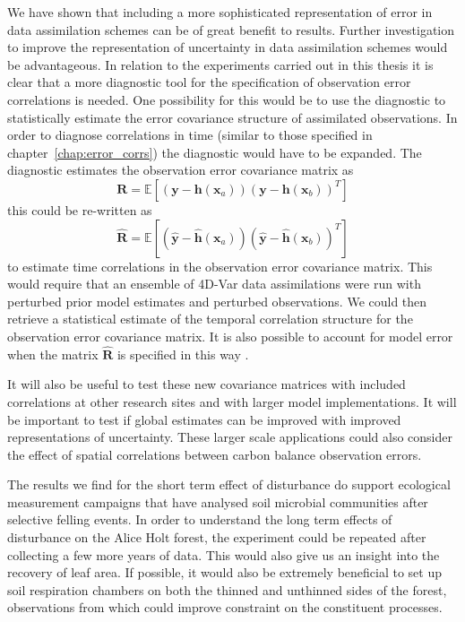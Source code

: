 We have shown that including a more sophisticated representation of error in data assimilation schemes can be of great benefit to results. Further investigation to improve the representation of uncertainty in data assimilation schemes would be advantageous. In relation to the experiments carried out in this thesis it is clear that a more diagnostic tool for the specification of observation error correlations is needed. One possibility for this would be to use the \citet{desroziers2005diagnosis} diagnostic to statistically estimate the error covariance structure of assimilated observations. In order to diagnose correlations in time (similar to those specified in chapter~\ref{chap:error_corrs}) the \citet{desroziers2005diagnosis} diagnostic would have to be expanded. The \citet{desroziers2005diagnosis} diagnostic estimates the observation error covariance matrix as
\begin{equation}
\textbf{R} = \mathbb{E}[(\textbf{y}-\textbf{h}(\textbf{x}_a))(\textbf{y}-\textbf{h}(\textbf{x}_b))^{T}]
\end{equation}
this could be re-written as
\begin{equation}
\hat{\textbf{R}} = \mathbb{E}[(\hat{\textbf{y}}-\hat{\textbf{h}}(\textbf{x}_a))(\hat{\textbf{y}}-\hat{\textbf{h}}(\textbf{x}_b))^{T}]
\end{equation}
to estimate time correlations in the observation error covariance matrix. This would require that an ensemble of 4D-Var data assimilations were run with perturbed prior model estimates and perturbed observations. We could then retrieve a statistical estimate of the temporal correlation structure for the observation error covariance matrix. It is also possible to account for model error when the matrix \(\hat{\textbf{R}}\) is specified in this way \citep{Howes2017}. 

It will also be useful to test these new covariance matrices with included correlations at other research sites and with larger model implementations. It will be important to test if global estimates can be improved with improved representations of uncertainty. These larger scale applications could also consider the effect of spatial correlations between carbon balance observation errors.

The results we find for the short term effect of disturbance do support ecological measurement campaigns that have analysed soil microbial communities after selective felling events. In order to understand the long term effects of disturbance on the Alice Holt forest, the experiment could be repeated after collecting a few more years of data. This would also give us an insight into the recovery of leaf area. If possible, it would also be extremely beneficial to set up soil respiration chambers on both the thinned and unthinned sides of the forest, observations from which could improve constraint on the constituent processes.

